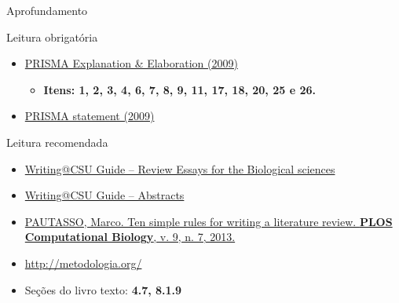 \documentclass{beamer}
\begin{document}
\begin{frame}{Aprofundamento}
  \begin{block}{Leitura obrigatória}
    \begin{itemize}
      \footnotesize
    \item \href{https://doi.org/10.1371/journal.pmed.1000100}
      {PRISMA Explanation \& Elaboration (2009)}
      \begin{itemize}
        \tiny
      \item {\bf Itens: 1, 2, 3, 4, 6, 7, 8, 9, 11, 17, 18, 20, 25 e 26.}
      \end{itemize}
      \smallskip
    \item {\footnotesize \href{https://doi.org/10.1371/journal.pmed.1000097}
        {PRISMA statement (2009)}}
    \end{itemize}
  \end{block}
  \begin{block}{Leitura recomendada}
    \begin{itemize}
      \tiny
    \item
      \href{https://writing.colostate.edu/guides/guide.cfm?guideid=79}{Writing@CSU Guide -- Review Essays for the Biological sciences}
    \item \href{https://writing.colostate.edu/guides/guide.cfm?guideid=59}{Writing@CSU Guide -- Abstracts}
    \item \href{https://doi.org/10.1371/journal.pcbi.1003149}
      {PAUTASSO, Marco. Ten simple rules for writing a literature review. {\bf PLOS Computational Biology}, v. 9, n. 7, 2013.}
    \item \url{http://metodologia.org/}
    \item Seções do livro texto: {\bf 4.7, 8.1.9}
    \end{itemize}
  \end{block}
\end{frame}
\end{document}
